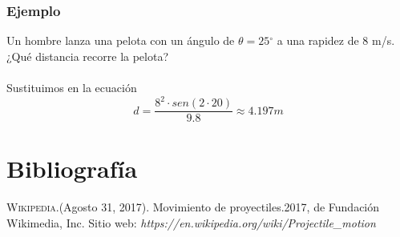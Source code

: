 \documentclass{article}
\begin{document}
\subsubsection{Ejemplo} Un hombre lanza una pelota con un ángulo de \(\theta=25\)$^{\circ}$ a una rapidez de 8 m/s. ¿Qué distancia recorre la pelota?\\\\
Sustituimos en la ecuación \[d=\frac{8^2 \cdot sen(2 \cdot 20)}{9.8} \approx 4.197 m\]

\section{Bibliografía}
\begin{thebibliography}{a}

 \textsc{Wikipedia.}(Agosto 31, 2017). Movimiento de proyectiles.2017, de Fundación Wikimedia, Inc. Sitio web: \textit{https://en.wikipedia.org/wiki/Projectile\_motion}

\end{thebibliography}
\end{document}
